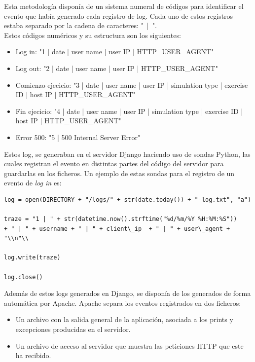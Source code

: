 \documentclass[11pt,a4paper]{book}
\begin{document}
			Esta metodología disponía de un sistema numeral de códigos para identificar el evento que había generado cada registro de log. Cada uno de estos registros estaba separado por la cadena de caracteres: "\ |\ ".\\
			
			Estos códigos numéricos y su estructura son los siguientes:
			\begin{itemize}
				\item Log in: "1 | date | user name | user IP | HTTP\_USER\_AGENT"
				\item Log out: "2 | date | user name | user IP | HTTP\_USER\_AGENT"
				\item Comienzo ejecicio: "3 | date | user name | user IP | simulation type | exercise ID | host IP | HTTP\_USER\_AGENT"
				\item Fin ejecicio: "4 | date | user name | user IP | simulation type | exercise ID | host IP | HTTP\_USER\_AGENT"
				\item Error 500: "5 | 500 Internal Server Error"
			\end{itemize}
		
			Estos log, se generaban en el servidor Django haciendo uso de sondas Python, las cuales registran el evento en distintas partes del código del servidor para guardarlas en los ficheros. Un ejemplo de estas sondas para el registro de un evento de \textit{log in} es:
			
			\begin{Verbatim}[tabsize=4]
log = open(DIRECTORY + "/logs/" + str(date.today()) + "-log.txt", "a")

traze = "1 | " + str(datetime.now().strftime("%d/%m/%Y %H:%M:%S")) 
+ " | " + username + " | " + client\_ip  + " | " + user\_agent + "\\n"\\

log.write(traze)

log.close()	
			\end{Verbatim}
			
			Además de estos logs generados en Django, se disponía de los generados de forma automática por Apache. Apache separa los eventos registrados en dos ficheros:  
			\begin{itemize}
				\item Un archivo con la salida general de la aplicación, asociada a los prints y excepciones producidas en el servidor.
				\item Un archivo de acceso al servidor que muestra las peticiones HTTP que este ha recibido.
			\end{itemize}
\end{document}
